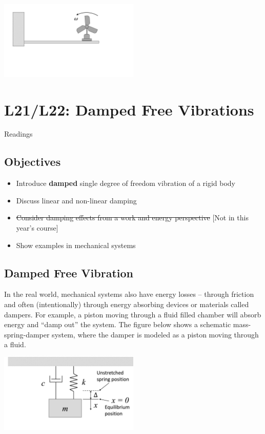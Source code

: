 \documentclass[12pt,letterpaper,twoside]{report}
\begin{document}
\includegraphics[trim={1cm 3cm 8cm 2cm},clip,width=0.5\textwidth, left]{Slide91}


\chapter{L21/L22: Damped Free Vibrations}
Readings

\section{Objectives}
\begin{itemize}
\item Introduce \textbf{damped} single degree of freedom vibration of a rigid body
\item Discuss linear and non-linear damping
\item \sout{Consider damping effects from a work and energy perspective} [Not in this year's course]
\item Show examples in mechanical systems
\end{itemize}

\section{Damped Free Vibration}
In the real world, mechanical systems also have energy losses – through friction and often (intentionally) through energy absorbing devices or materials called dampers. For example, a piston moving through a fluid filled chamber will absorb energy and “damp out” the system.  The figure below shows a schematic mass-spring-damper system, where the damper is modeled as a piston moving through a fluid.  

\includegraphics[trim={6cm 1cm 0cm 1cm},clip,width=0.5\textwidth, center]{Slide93}
\end{document}
